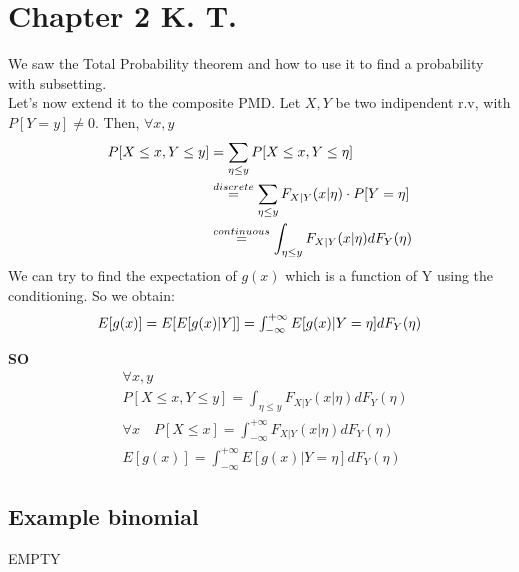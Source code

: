 \section{Chapter 2 K. T. }
We saw the Total Probability theorem and how to use it to find a probability with subsetting.\\
Let's now extend it to the composite PMD. Let $X,Y$ be two indipendent r.v, with $P[Y=y]\neq 0$.
Then, $\forall x,y$
\begin{equation}$$
  \begin{split}
    P[X\le x, Y \le y] &= \sum \limits_{\eta \le y} P[X \le x , Y \le \eta] \\
    &\stackrel{discrete}{=} \sum \limits_{\eta \le y} F_{X|Y}(x | \eta) \cdot P[Y=\eta]\\
    &\stackrel{continuous}{=} \int_{\eta \le y} F_{X|Y}(x|\eta) dF_Y(\eta)
  \end{split}$$
\end{equation}
We can try to find the expectation of $g(x)$ which is a function of Y using the conditioning. So we obtain:
\begin{equation}
  $$E[g(x)]=E[E[g(x)|Y]] = \int_{-\infty}^{+\infty}E[g(x)|Y=\eta] dF_Y(\eta)$$
\end{equation}

\textbf{SO}
\begin{equation}
  \begin{split}
   &\forall x,y \\
  &P[X\le x , Y \le y] = \int_{\eta \le y} F_{X|Y}(x|\eta) dF_Y(\eta)\\
  &\forall x \quad P[X \le x] = \int_{-\infty}^{+\infty}F_{X|Y}(x|\eta) dF_Y(\eta) \\
  &E[g(x)]=\int_{-\infty}^{+\infty}
  E[g(x)|Y=\eta] dF_Y(\eta)
  \end{split}
\end{equation}

\subsection{Example binomial}
EMPTY

